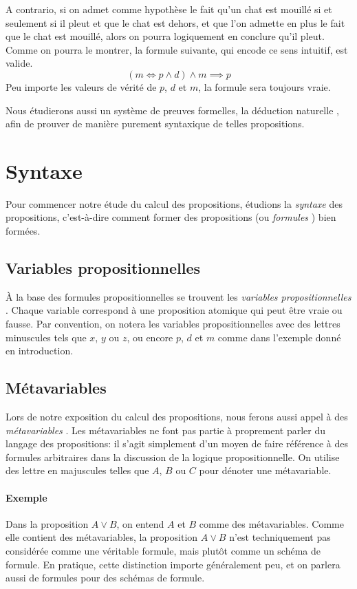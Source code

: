 A contrario, si on admet comme hypothèse le fait qu'un chat est mouillé si et seulement si il pleut et que le chat est dehors, et que l'on admette en plus le fait que le chat est mouillé, alors on pourra logiquement en conclure qu'il pleut.
Comme on pourra le montrer, la formule suivante, qui encode ce sens intuitif, est valide.
\[
(m \iff p \wedge d) \wedge m \implies p
\]
Peu importe les valeurs de vérité de $p$, $d$ et $m$, la formule sera toujours vraie.

Nous étudierons aussi un système de preuves formelles, la \og déduction naturelle \fg{}, afin de prouver de manière purement syntaxique de telles propositions.

\section{Syntaxe}

Pour commencer notre étude du calcul des propositions, étudions la \textit{syntaxe} des propositions, c'est-à-dire comment former des propositions (ou \og \textit{formules} \fg{}) bien formées. 

\subsection{Variables propositionnelles}

À la base des formules propositionnelles se trouvent les \og{} \textit{variables propositionnelles} \fg{}.
Chaque variable correspond à une proposition atomique qui peut être vraie ou fausse.
Par convention, on notera les variables propositionnelles avec des lettres minuscules tels que $x$, $y$ ou $z$, ou encore $p$, $d$ et $m$ comme dans l'exemple donné en introduction.

\subsection{Métavariables}

Lors de notre exposition du calcul des propositions, nous ferons aussi appel à des \og \textit{métavariables} \fg{}.
Les métavariables ne font pas partie à proprement parler du langage des propositions: il s'agit simplement d'un moyen de faire référence à des formules arbitraires dans la discussion de la logique propositionnelle.
On utilise des lettre en majuscules telles que $A$, $B$ ou $C$ pour dénoter une métavariable.

\paragraph{Exemple} Dans la proposition $A \vee B$, on entend $A$ et $B$ comme des métavariables.
Comme elle contient des métavariables, la proposition $A \vee B$ n'est techniquement pas considérée comme une véritable formule, mais plutôt comme un schéma de formule.
En pratique, cette distinction importe généralement peu, et on parlera aussi de formules pour des schémas de formule.

